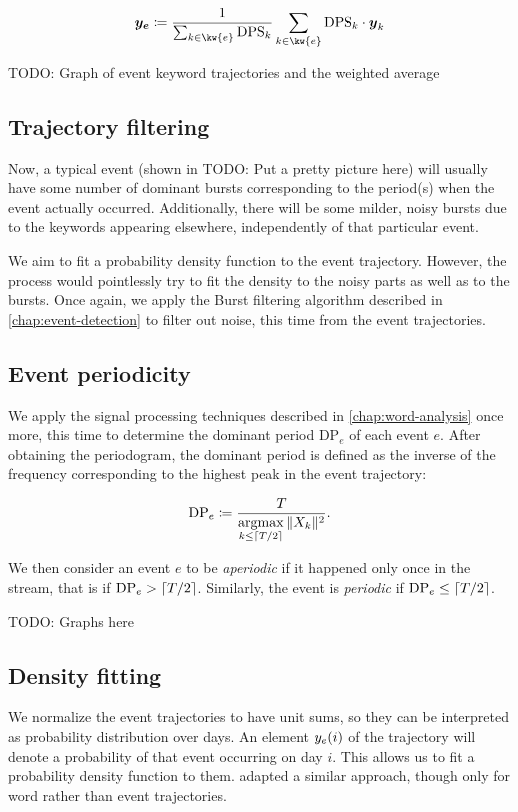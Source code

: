 \begin{equation}
	\vect{\traj_{e}} \coloneqq \frac{1}{\sum_{k \in \kw{e}}{\text{DPS}_{k}}} \sum_{k \in \kw{e}}{\text{DPS}_{k} \cdot \vect{\traj}_{k}}
\end{equation}

{\color{red} TODO: Graph of event keyword trajectories and the weighted average}


\subsection{Trajectory filtering}

Now, a typical event (shown in {\color{red} TODO: Put a pretty picture here}) will usually have some number of dominant bursts corresponding to the period(s) when the event actually occurred. Additionally, there will be some milder, noisy bursts due to the keywords appearing elsewhere, independently of that particular event.

We aim to fit a probability density function to the event trajectory. However, the process would pointlessly try to fit the density to the noisy parts as well as to the bursts. Once again, we apply the Burst filtering algorithm described in \autoref{chap:event-detection} to filter out noise, this time from the event trajectories.

\subsection{Event periodicity}
We apply the signal processing techniques described in \autoref{chap:word-analysis} once more, this time to determine the dominant period $\text{DP}_{e}$ of each event $e$. After obtaining the periodogram, the dominant period is defined as the inverse of the frequency corresponding to the highest peak in the event trajectory:

\begin{equation}
	\text{DP}_{e} \coloneqq \frac{T}{\operatorname*{argmax}\limits_{k \leq \lceil T / 2\rceil}{\|X_{k}\|^{2}}}.
\end{equation}

We then consider an event $e$ to be \textit{aperiodic} if it happened only once in the stream, that is if $\text{DP}_{e} > \lceil T / 2\rceil$. Similarly, the event is \textit{periodic} if $\text{DP}_{e} \leq \lceil T / 2\rceil$.

{\color{red} TODO: Graphs here}

\subsection{Density fitting}
We normalize the event trajectories to have unit sums, so they can be interpreted as probability distribution over days. An element $y_{e}(i)$ of the trajectory will denote a probability of that event occurring on day $i$. This allows us to fit a probability density function to them. \cite{event-detection} adapted a similar approach, though only for word rather than event trajectories.

